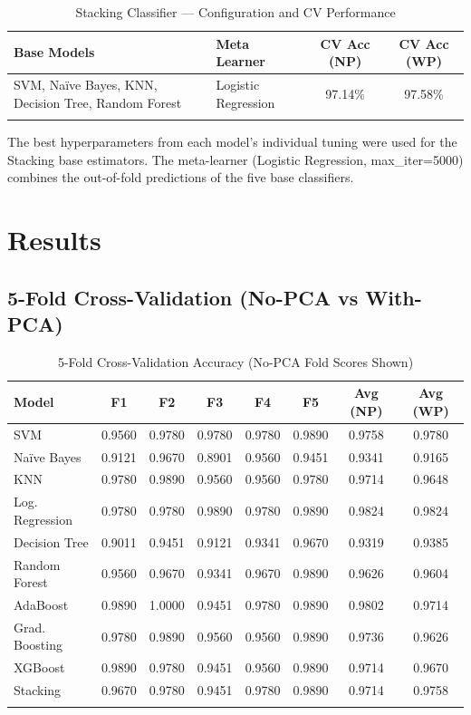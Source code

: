 \documentclass[12pt,a4paper]{article}
\begin{document}
\begin{longtable}{|p{5cm}|p{3cm}|c|c|}
\hline
\textbf{Base Models} & \textbf{Meta Learner} & \textbf{CV Acc (NP)} & \textbf{CV Acc (WP)} \\ \hline
\endhead
SVM, Na\"ive Bayes, KNN, Decision Tree, Random Forest & Logistic Regression & 97.14\% & 97.58\% \\ \hline
\caption{Stacking Classifier — Configuration and CV Performance}
\label{tab:stk_tuning}
\end{longtable}

The best hyperparameters from each model's individual tuning were used for the Stacking base estimators. The meta-learner (Logistic Regression, max\_iter=5000) combines the out-of-fold predictions of the five base classifiers.

\section{Results}

\subsection{5-Fold Cross-Validation (No-PCA vs With-PCA)}

\begin{longtable}{|l|c|c|c|c|c|c|c|}
\hline
\textbf{Model} & \textbf{F1} & \textbf{F2} & \textbf{F3} & \textbf{F4} & \textbf{F5} & \textbf{Avg (NP)} & \textbf{Avg (WP)} \\ \hline
\endhead
SVM & 0.9560 & 0.9780 & 0.9780 & 0.9780 & 0.9890 & 0.9758 & 0.9780 \\ \hline
Na\"ive Bayes & 0.9121 & 0.9670 & 0.8901 & 0.9560 & 0.9451 & 0.9341 & 0.9165 \\ \hline
KNN & 0.9780 & 0.9890 & 0.9560 & 0.9560 & 0.9780 & 0.9714 & 0.9648 \\ \hline
Log. Regression & 0.9780 & 0.9780 & 0.9890 & 0.9780 & 0.9890 & 0.9824 & 0.9824 \\ \hline
Decision Tree & 0.9011 & 0.9451 & 0.9121 & 0.9341 & 0.9670 & 0.9319 & 0.9385 \\ \hline
Random Forest & 0.9560 & 0.9670 & 0.9341 & 0.9670 & 0.9890 & 0.9626 & 0.9604 \\ \hline
AdaBoost & 0.9890 & 1.0000 & 0.9451 & 0.9780 & 0.9890 & 0.9802 & 0.9714 \\ \hline
Grad. Boosting & 0.9780 & 0.9890 & 0.9560 & 0.9560 & 0.9890 & 0.9736 & 0.9626 \\ \hline
XGBoost & 0.9890 & 0.9780 & 0.9451 & 0.9560 & 0.9890 & 0.9714 & 0.9670 \\ \hline
Stacking & 0.9670 & 0.9780 & 0.9451 & 0.9780 & 0.9890 & 0.9714 & 0.9758 \\ \hline
\caption{5-Fold Cross-Validation Accuracy (No-PCA Fold Scores Shown)}
\label{tab:cv_results}
\end{longtable}
\end{document}
